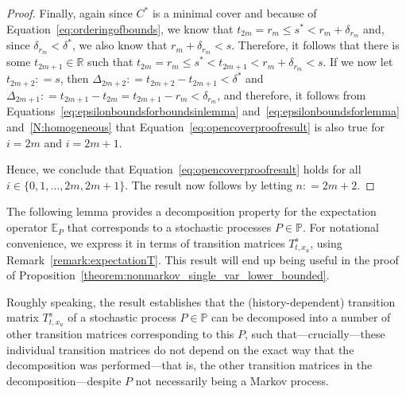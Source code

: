 \documentclass[10pt,a4paper]{paper}
\theoremstyle{definition}
\newcommand{\reals}{\mathbb{R}}
\newcommand{\processes}{\mathbb{P}}
\newcommand{\coloneqq}{:\!=}
\begin{document}
\begin{proof}
Finally, again since $C^*$ is a minimal cover and because of Equation~\eqref{eq:orderingofbounds}, we know that $t_{2m}=r_m\leq s^*<r_m+\delta_{r_m}$ and, since $\delta_{r_m}<\delta^*$, we also know that $r_m+\delta_{r_m}<s$. Therefore, it follows that there is some $t_{2m+1}\in\reals$ such that $t_{2m}=r_m\leq s^*<t_{2m+1}<r_m+\delta_{r_m}<s$. If we now let $t_{2m+2}\coloneqq s$, then $\Delta_{2m+2}\coloneqq t_{2m+2}-t_{2m+1}<\delta^*$ and $\Delta_{2m+1}\coloneqq t_{2m+1}-t_{2m}=t_{2m+1}-r_m<\delta_{r_m}$, and therefore, it follows from Equations~\eqref{eq:epsilonboundsforboundsinlemma} and~\eqref{eq:epsilonboundsforlemma} and~\ref{N:homogeneous} that Equation~\eqref{eq:opencoverproofresult} is also true for $i=2m$ and $i=2m+1$.

Hence, we conclude that Equation~\eqref{eq:opencoverproofresult} holds for all $i\in\{0,1,\dots,2m,2m+1\}$. The result now follows by letting $n\coloneqq2m+2$.
\end{proof}



The following lemma provides a decomposition property for the expectation operator $\mathbb{E}_P$ that corresponds to a stochastic processes $P\in\processes$. For notational convenience, we express it in terms of transition matrices $T_{t,x_u}^s$, using Remark~\ref{remark:expectationT}. This result will end up being useful in the proof of Proposition~\ref{theorem:nonmarkov_single_var_lower_bounded}.

Roughly speaking, the result establishes that the (history-dependent) transition matrix $T_{t,x_u}^s$ of a stochastic process $P\in\processes$ can be decomposed into a number of other transition matrices corresponding to this $P$, such that---crucially---these individual transition matrices do not depend on the exact way that the decomposition was performed---that is, the other transition matrices in the decomposition---despite $P$ not necessarily being a Markov process.
\end{document}
